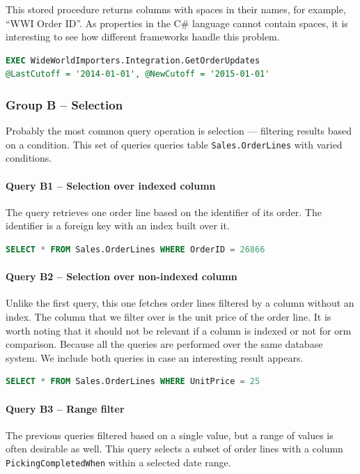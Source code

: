 This stored procedure returns columns with spaces in their names, for example, ``WWI Order ID''. As properties in the C\# language cannot contain spaces, it is interesting to see how different frameworks handle this problem.

\begin{lstlisting}[language=SQL]
EXEC WideWorldImporters.Integration.GetOrderUpdates 
@LastCutoff = '2014-01-01', @NewCutoff = '2015-01-01'
\end{lstlisting}

\subsubsection{Group B -- Selection}
Probably the most common query operation is selection --- filtering results based on a condition. This set of queries queries table \texttt{Sales.OrderLines} with varied conditions.

\paragraph{Query B1 -- Selection over indexed column}
\label{query:b1}
The query retrieves one order line based on the identifier of its order. The identifier is a foreign key with an index built over it.

\begin{lstlisting}[language=SQL]
SELECT * FROM Sales.OrderLines WHERE OrderID = 26866
\end{lstlisting}

\paragraph{Query B2 -- Selection over non-indexed column}
\label{query:b2}
Unlike the first query, this one fetches order lines filtered by a column without an index. The column that we filter over is the unit price of the order line.
It is worth noting that it should not be relevant if a column is indexed or not for \acrshort{orm} comparison. Because all the queries are performed over the same database system. We include both queries in case an interesting result appears.

\begin{lstlisting}[language=SQL]
SELECT * FROM Sales.OrderLines WHERE UnitPrice = 25
\end{lstlisting}

\paragraph{Query B3 -- Range filter}
\label{query:b3}
The previous queries filtered based on a single value, but a range of values is often desirable as well.
This query selects a subset of order lines with a column \texttt{PickingCompletedWhen} within a selected date range.

